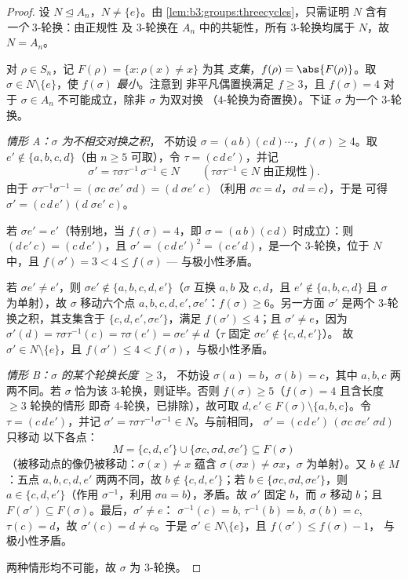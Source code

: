 \begin{proof}
设 $N \trianglelefteq A_n$，$N \neq \{e\}$。由
\cref{lem:b3:groups:threecycles}，只需证明 $N$
含有 \emph{一个} $3$-轮换：由正规性
及 $3$-轮换在 $A_n$ 中的共轭性，所有 $3$-轮换均属于 $N$，故 $N = A_n$。

对 $\rho \in S_n$，记 $F(\rho) = \{x : \rho(x) \neq x\}$ 为其
\emph{支集}，$f(\rho) = \abs{F(\rho)}$。取 $\sigma \in N
\setminus \{e\}$，使 $f(\sigma)$ \emph{最小}。注意到
非平凡偶置换满足 $f \geq 3$，且 $f(\sigma) =
4$ 对于 $\sigma \in A_n$ 不可能成立，除非 $\sigma$ 为双对换
（$4$-轮换为奇置换）。下证 $\sigma$ 为一个
$3$-轮换。

\emph{情形 A：$\sigma$ 为不相交对换之积}，
不妨设 $\sigma = (a\,b)(c\,d)\cdots$，$f(\sigma) \geq 4$。取 $e'
\notin \{a, b, c, d\}$（由 $n \geq 5$ 可取），令 $\tau =
(c\,d\,e')$，并记
\[
\sigma' = \tau\sigma\tau^{-1}\,\sigma^{-1} \in N
\qquad (\tau\sigma\tau^{-1} \in N \text{ 由正规性}).
\]
由于 $\sigma\tau^{-1}\sigma^{-1} = (\sigma c\;\sigma e'\;\sigma
d) = (d\;\sigma e'\;c)$（利用 $\sigma c = d$，$\sigma d = c$），于是
可得 $\sigma' = (c\,d\,e')(d\;\sigma e'\;c)$。

若 $\sigma e' = e'$（特别地，当 $f(\sigma) =
4$，即 $\sigma = (a\,b)(c\,d)$ 时成立）：则 $(d\,e'\,c) =
(c\,d\,e')$，且 $\sigma' = (c\,d\,e')^2 = (c\,e'\,d)$，是一个
$3$-轮换，位于 $N$ 中，且 $f(\sigma') = 3 < 4 \leq f(\sigma)$
--- 与极小性矛盾。

若 $\sigma e' \neq e'$，则 $\sigma e' \notin \{a, b, c, d,
e'\}$（$\sigma$ 互换 $a,b$ 及 $c,d$，且 $e' \notin \{a,b,c,d\}$
且 $\sigma$ 为单射），故 $\sigma$ 移动六个点 $a, b,
c, d, e', \sigma e'$：$f(\sigma) \geq 6$。另一方面
$\sigma'$ 是两个 $3$-轮换之积，其支集含于 $\{c, d,
e', \sigma e'\}$，满足 $f(\sigma') \leq 4$；且 $\sigma' \neq
e$，因为 $\sigma'(d) = \tau\sigma\tau^{-1}(c) = \tau\sigma(e') =
\sigma e' \neq d$（$\tau$ 固定 $\sigma e' \notin \{c,d,e'\}$）。
故 $\sigma' \in N \setminus\{e\}$，且 $f(\sigma') \leq 4 <
f(\sigma)$，与极小性矛盾。

\emph{情形 B：$\sigma$ 的某个轮换长度 $\geq 3$}，
不妨设 $\sigma(a) = b$，$\sigma(b) = c$，其中 $a, b, c$ 两两不同。若
$\sigma$ 恰为该 $3$-轮换，则证毕。否则
$f(\sigma) \geq 5$（$f(\sigma) = 4$ 且含长度 $\geq3$ 轮换的情形
即奇 $4$-轮换，已排除），故可取 $d, e' \in
F(\sigma) \setminus \{a, b, c\}$。令 $\tau = (c\,d\,e')$，并记
$\sigma' = \tau\sigma\tau^{-1}\sigma^{-1} \in N$。与前相同，
$\sigma' = (c\,d\,e')\,(\sigma c\;\sigma e'\;\sigma d)$ 只移动
以下各点：
\[
M = \{c, d, e'\} \cup \{\sigma c, \sigma d, \sigma e'\}
\subseteq F(\sigma)
\]
（被移动点的像仍被移动：$\sigma(x) \ne x$ 蕴含
$\sigma(\sigma x) \neq \sigma x$，$\sigma$ 为单射）。又
$b \notin M$：五点 $a, b, c, d, e'$ 两两不同，故 $b
\notin \{c, d, e'\}$；若 $b \in \{\sigma c, \sigma d, \sigma
e'\}$，则 $a \in \{c, d, e'\}$（作用 $\sigma^{-1}$，利用
$\sigma a = b$），矛盾。故 $\sigma'$ 固定 $b$，而
$\sigma$ 移动 $b$；且
$F(\sigma') \subseteq F(\sigma)$。最后，$\sigma' \neq e$：
$\sigma^{-1}(c) = b$, $\tau^{-1}(b) = b$, $\sigma(b) = c$,
$\tau(c) = d$，故 $\sigma'(c) = d \neq c$。于是 $\sigma' \in N
\setminus \{e\}$，且 $f(\sigma') \leq f(\sigma) - 1$，
与极小性矛盾。

两种情形均不可能，故 $\sigma$ 为 $3$-轮换。
\end{proof}

